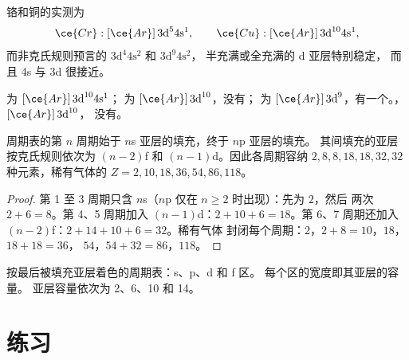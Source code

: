 \begin{proposition}[第一过渡系中的两个例外]\label{prop:b1:quantum-numbers:exceptions}
铬和铜的实测为
\[
  \ce{Cr}: [\ce{Ar}]\,3\text{d}^5 4\text{s}^1, \qquad
  \ce{Cu}: [\ce{Ar}]\,3\text{d}^{10} 4\text{s}^1 ,
\]
而非克氏规则预言的 $3\text{d}^4 4\text{s}^2$ 和 $3\text{d}^9 4\text{s}^2$，
半充满或全充满的 d 亚层特别稳定，
而且 4s 与 3d 很接近。
\end{proposition}

\begin{example}[铜及其离子]\label{ex:b1:quantum-numbers:copper}
 为 $[\ce{Ar}]\,3\text{d}^{10} 4\text{s}^1$； 为
$[\ce{Ar}]\,3\text{d}^{10}$，没有； 为
$[\ce{Ar}]\,3\text{d}^9$，有一个。，$[\ce{Ar}]\,3\text{d}^{10}$，
没有。
\end{example}

\begin{proposition}[电子排布与周期表]\label{prop:b1:quantum-numbers:table}
周期表的第 $n$ 周期始于 $n$s 亚层的填充，终于 $n$p 亚层的填充。
其间填充的亚层按克氏规则依次为
$(n-2)$f 和 $(n-1)$d。因此各周期容纳
$2, 8, 8, 18, 18, 32, 32$ 种元素，稀有气体的 $Z = 2, 10,
18, 36, 54, 86, 118$。
\end{proposition}

\begin{proof}
第 1 至 3 周期只含 $n$s（$n$p 仅在 $n \ge 2$ 时出现）：先为 $2$，然后
两次 $2 + 6 = 8$。第 4、5 周期加入 $(n-1)$d：$2 + 10 + 6 =
18$。第 6、7 周期还加入 $(n-2)$f：$2 + 14 + 10 + 6 = 32$。稀有气体
封闭每个周期：$2$，$2 + 8 = 10$，$18$，$18 + 18 = 36$，
$54$，$54 + 32 = 86$，$118$。
\end{proof}

\begin{omfigure}
\omperiodictable[colour=blocks, legend]

{\small 按最后被填充亚层着色的周期表：s、p、d 和 f 区。
每个区的宽度即其亚层的容量。
亚层容量依次为 2、6、10 和 14。}
\end{omfigure}

\section{练习}

